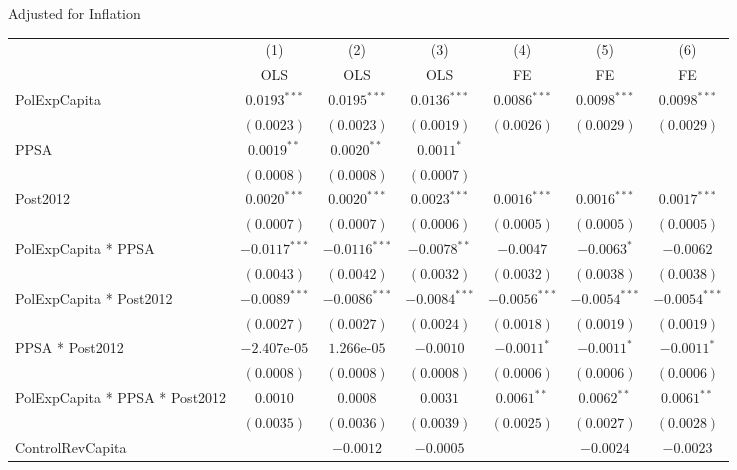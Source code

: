 \documentclass[border=10pt,varwidth=25cm]{standalone}
\renewenvironment{table}[1][]{}{}
\begin{document}
\begin{table}[H]
    \centering
    \scriptsize
    \begin{minipage}{\textwidth}
    \centering
    {\normalsize Adjusted for Inflation}
    \vspace{6pt}
    \begin{tabular}{lcccccc}
        \toprule
         & (1) & (2) & (3) & (4) & (5) & (6) \\
         & OLS & OLS & OLS & FE & FE & FE \\
        \midrule
        PolExpCapita & $0.0193^{***}$ & $0.0195^{***}$ & $0.0136^{***}$ & $0.0086^{***}$ & $0.0098^{***}$ & $0.0098^{***}$ \\
         & $(0.0023)$ & $(0.0023)$ & $(0.0019)$ & $(0.0026)$ & $(0.0029)$ & $(0.0029)$ \\[4pt]
        PPSA & $0.0019^{**}$ & $0.0020^{**}$ & $0.0011^{*}$ &  &  &  \\
         & $(0.0008)$ & $(0.0008)$ & $(0.0007)$ &  &  &  \\[4pt]
        Post2012 & $0.0020^{***}$ & $0.0020^{***}$ & $0.0023^{***}$ & $0.0016^{***}$ & $0.0016^{***}$ & $0.0017^{***}$ \\
         & $(0.0007)$ & $(0.0007)$ & $(0.0006)$ & $(0.0005)$ & $(0.0005)$ & $(0.0005)$ \\[4pt]
        PolExpCapita * PPSA & $-0.0117^{***}$ & $-0.0116^{***}$ & $-0.0078^{**}$ & $-0.0047$ & $-0.0063^{*}$ & $-0.0062$ \\
         & $(0.0043)$ & $(0.0042)$ & $(0.0032)$ & $(0.0032)$ & $(0.0038)$ & $(0.0038)$ \\[4pt]
        PolExpCapita * Post2012 & $-0.0089^{***}$ & $-0.0086^{***}$ & $-0.0084^{***}$ & $-0.0056^{***}$ & $-0.0054^{***}$ & $-0.0054^{***}$ \\
         & $(0.0027)$ & $(0.0027)$ & $(0.0024)$ & $(0.0018)$ & $(0.0019)$ & $(0.0019)$ \\[4pt]
        PPSA * Post2012 & $-2.407\text{e-}05$ & $1.266\text{e-}05$ & $-0.0010$ & $-0.0011^{*}$ & $-0.0011^{*}$ & $-0.0011^{*}$ \\
         & $(0.0008)$ & $(0.0008)$ & $(0.0008)$ & $(0.0006)$ & $(0.0006)$ & $(0.0006)$ \\[4pt]
        PolExpCapita * PPSA * Post2012 & $0.0010$ & $0.0008$ & $0.0031$ & $0.0061^{**}$ & $0.0062^{**}$ & $0.0061^{**}$ \\
         & $(0.0035)$ & $(0.0036)$ & $(0.0039)$ & $(0.0025)$ & $(0.0027)$ & $(0.0028)$ \\[4pt]
        ControlRevCapita &  & $-0.0012$ & $-0.0005$ &  & $-0.0024$ & $-0.0023$ \\

\end{tabular}
\end{minipage}
\end{table}
\end{document}
